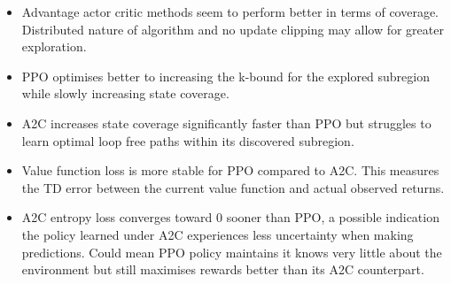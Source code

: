 \documentclass[conference,compsoc]{IEEEtran}
\begin{document}
\begin{itemize}
	\item Advantage actor critic methods seem to perform better in terms of coverage. Distributed nature of algorithm and no update clipping may allow for greater exploration.
	\item PPO optimises better to increasing the k-bound for the explored subregion while slowly increasing state coverage.
	\item A2C increases state coverage significantly faster than PPO but struggles to learn optimal loop free paths within its discovered subregion.
	\item Value function loss is more stable for PPO compared to A2C. This measures the TD error between the current value function and actual observed returns.
	\item A2C entropy loss converges toward 0 sooner than PPO, a possible indication the policy learned under A2C experiences less uncertainty when making predictions. Could mean PPO policy maintains it knows very little about the environment but still maximises rewards better than its A2C counterpart.
\end{itemize}

%
%
\end{document}
